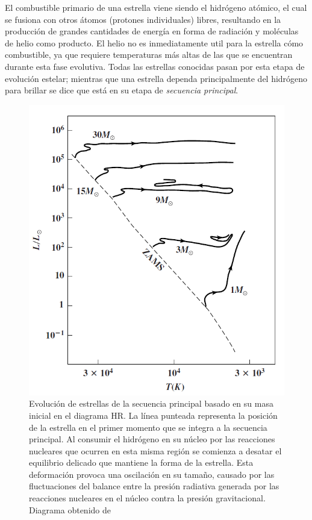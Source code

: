 El combustible primario de una estrella viene siendo el hidrógeno atómico, el
cual se fusiona con otros átomos (protones individuales) libres, resultando en
la producción de grandes cantidades de energía en forma de radiación y moléculas
de helio como producto. El helio no es inmediatamente util para la estrella cómo
combustible, ya que requiere temperaturas más altas de las que se encuentran
durante esta fase evolutiva. Todas las estrellas conocidas pasan por esta etapa
de evolución estelar; mientras que una estrella dependa principalmente del
hidrógeno para brillar se dice que está en su etapa de \textit{secuencia
principal}. 

\begin{figure}[!ht]
	\centering
	\includegraphics[scale=0.43]{Introduccion/Figures/Figura Evolucion_MS_Astronomy_Physical_Perspective.png}
	\caption{Evolución de estrellas de la secuencia principal basado en su masa
	inicial en el diagrama HR. La línea punteada representa la posición de la
	estrella en el primer momento que se integra a la secuencia principal. Al
	consumir el hidrógeno en su núcleo por las reacciones nucleares que ocurren
	en esta misma región se comienza a desatar el equilibrio delicado que
	mantiene la forma de la estrella. Esta deformación provoca una oscilación en
	su tamaño, causado por las fluctuaciones del balance entre la presión
	radiativa generada por las reacciones nucleares en el núcleo contra la
	presión gravitacional. Diagrama obtenido de
	}
	\label{evolucionMSEstrella}
\end{figure}